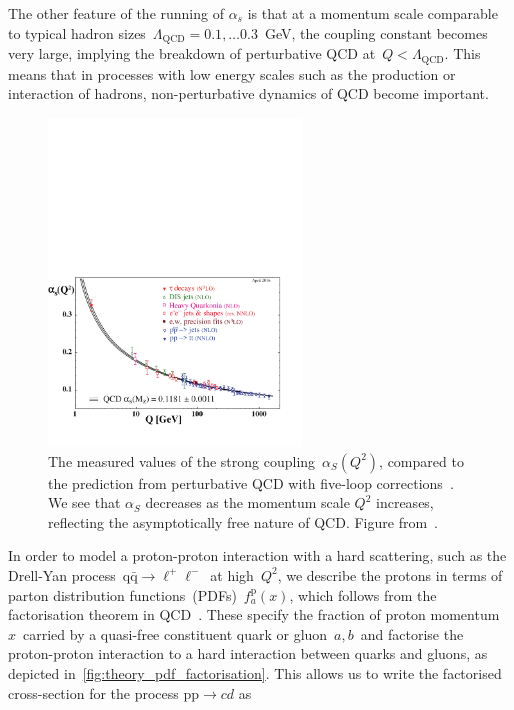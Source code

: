 The other feature of the running of $\alpha_s$ is that at a momentum scale comparable to typical hadron sizes~$\Lambda_{\mathrm{QCD}} = 0.1,\dots0.3$~GeV, the coupling constant becomes very large, implying the breakdown of perturbative QCD at~$Q < \Lambda_{\mathrm{QCD}}$. This means that in processes with low energy scales such as the production or interaction of hadrons, non-perturbative dynamics of QCD become important.

\begin{figure}
\begin{centering}
\includegraphics[width=0.6\textwidth]{figures/theory/asq-2015.pdf}
\caption[The measured values of~$\alpha_S(Q^2)$ compared the perturbative QCD prediction]{The measured values of the strong coupling~$\alpha_S(Q^2)$, compared to the prediction from perturbative QCD with five-loop corrections~\cite{Herren:2017osy}. We see that $\alpha_S$ decreases as the momentum scale $Q^2$ increases, reflecting the asymptotically free nature of QCD. Figure from~\cite{Patrignani:2016xqp}.}
\label{fig:theory_alphas_running}
\end{centering}
\end{figure}

In order to model a proton-proton interaction with a hard scattering, such as the Drell-Yan process~$\mathrm{q} \bar{\mathrm{q}} \rightarrow \ell^+ \ell^-$~at high~$Q^2$, we describe the protons in terms of parton distribution functions~(PDFs)~$f_a^{\mathrm{p}}(x)$, which follows from the factorisation theorem in QCD~\cite{collins1989perturbative}. These specify the fraction of proton momentum~$x$~carried by a quasi-free constituent quark or gluon~$a,b$~and factorise the proton-proton interaction to a hard interaction between quarks and gluons, as depicted in~\cref{fig:theory_pdf_factorisation}. This allows us to write the factorised cross-section for the process $\mathrm{p} \mathrm{p} \rightarrow cd$ as


